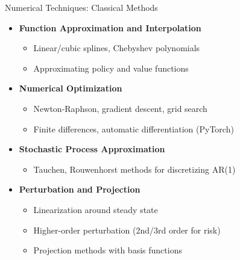 \documentclass[10pt,english,aspectratio=169]{beamer}
\begin{document}
\begin{frame}{Numerical Techniques: Classical Methods}
\begin{itemize}
\item \textbf{Function Approximation and Interpolation}
\begin{itemize}
    \item Linear/cubic splines, Chebyshev polynomials
    \item Approximating policy and value functions
\end{itemize}

\medskip
\item \textbf{Numerical Optimization}
\begin{itemize}
    \item Newton-Raphson, gradient descent, grid search
    \item Finite differences, automatic differentiation (PyTorch)
\end{itemize}

\medskip
\item \textbf{Stochastic Process Approximation}
\begin{itemize}
    \item Tauchen, Rouwenhorst methods for discretizing AR(1)
\end{itemize}

\medskip
\item \textbf{Perturbation and Projection}
\begin{itemize}
    \item Linearization around steady state
    \item Higher-order perturbation (2nd/3rd order for risk)
    \item Projection methods with basis functions
\end{itemize}
\end{itemize}
\end{frame}
\end{document}
